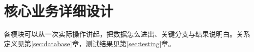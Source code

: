 \section{核心业务详细设计}\label{sec:detailed}
各模块可以从一次实际操作讲起，把数据怎么进出、关键分支与结果说明白。关系定义见第\ref{sec:database}章，测试结果见第\ref{sec:testing}章。





